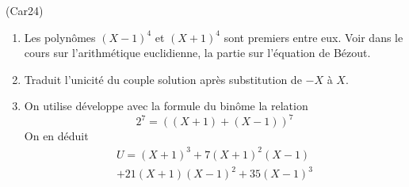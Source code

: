 \begin{tiny}(Car24)\end{tiny} 
\begin{enumerate}
  \item  Les polynômes $(X-1)^4$ et $(X+1)^4$ sont premiers entre eux. Voir dans le cours sur l'arithmétique euclidienne, la partie sur l'équation de Bézout.
  \item Traduit l'unicité du couple solution après substitution de $-X$ à $X$.
  \item  On utilise développe avec la formule du binôme la relation
\begin{displaymath}
 2^7 = \left( (X+1) + (X-1)\right)^7 
\end{displaymath}
On en déduit
\begin{multline*}
 U = (X+1)^3 + 7(X+1)^2(X-1)  \\ + 21(X+1)(X-1)^2 +35(X-1)^3
\end{multline*}

\end{enumerate}

 
